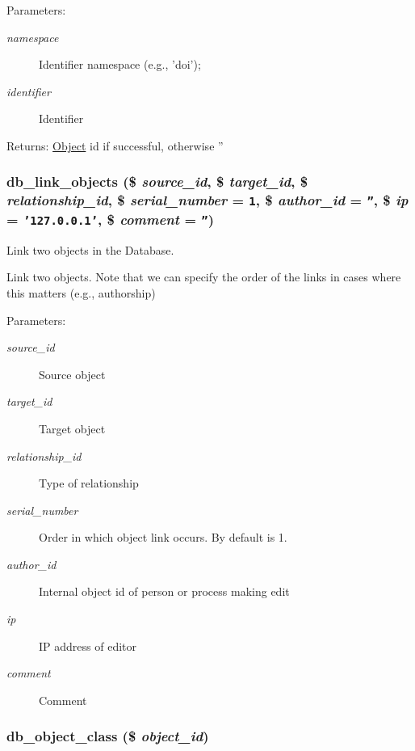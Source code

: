 \begin{Desc}
\item[Parameters:]
\begin{description}
\item[{\em namespace}]Identifier namespace (e.g., 'doi'); \item[{\em identifier}]Identifier\end{description}
\end{Desc}
\begin{Desc}
\item[Returns:]\hyperlink{class_object}{Object} id if successful, otherwise '' \end{Desc}
\hypertarget{eav_8php_6bd82e0a9e6fd2965fb51b7c0e271156}{
\subsubsection{\setlength{\rightskip}{0pt plus 5cm}db\_\-link\_\-objects (\$ {\em source\_\-id}, \/  \$ {\em target\_\-id}, \/  \$ {\em relationship\_\-id}, \/  \$ {\em serial\_\-number} = {\tt 1}, \/  \$ {\em author\_\-id} = {\tt ''}, \/  \$ {\em ip} = {\tt '127.0.0.1'}, \/  \$ {\em comment} = {\tt ''})}}
\label{eav_8php_6bd82e0a9e6fd2965fb51b7c0e271156}


Link two objects in the Database. 

Link two objects. Note that we can specify the order of the links in cases where this matters (e.g., authorship)

\begin{Desc}
\item[Parameters:]
\begin{description}
\item[{\em source\_\-id}]Source object \item[{\em target\_\-id}]Target object \item[{\em relationship\_\-id}]Type of relationship \item[{\em serial\_\-number}]Order in which object link occurs. By default is 1. \item[{\em author\_\-id}]Internal object id of person or process making edit \item[{\em ip}]IP address of editor \item[{\em comment}]Comment \end{description}
\end{Desc}
\hypertarget{eav_8php_7df7424ef9bab8c0fb6ae74d0b2d27fb}{
\subsubsection{\setlength{\rightskip}{0pt plus 5cm}db\_\-object\_\-class (\$ {\em object\_\-id})}}
\label{eav_8php_7df7424ef9bab8c0fb6ae74d0b2d27fb}


